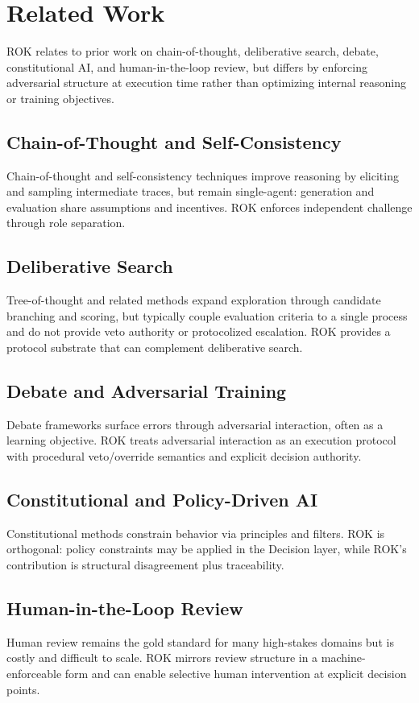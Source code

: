 \section{Related Work}

ROK relates to prior work on chain-of-thought, deliberative search, debate, constitutional AI, and human-in-the-loop review, but differs by enforcing adversarial structure at execution time rather than optimizing internal reasoning or training objectives.

\subsection{Chain-of-Thought and Self-Consistency}
Chain-of-thought and self-consistency techniques improve reasoning by eliciting and sampling intermediate traces, but remain single-agent: generation and evaluation share assumptions and incentives. ROK enforces independent challenge through role separation.

\subsection{Deliberative Search}
Tree-of-thought and related methods expand exploration through candidate branching and scoring, but typically couple evaluation criteria to a single process and do not provide veto authority or protocolized escalation. ROK provides a protocol substrate that can complement deliberative search.

\subsection{Debate and Adversarial Training}
Debate frameworks surface errors through adversarial interaction, often as a learning objective. ROK treats adversarial interaction as an execution protocol with procedural veto/override semantics and explicit decision authority.

\subsection{Constitutional and Policy-Driven AI}
Constitutional methods constrain behavior via principles and filters. ROK is orthogonal: policy constraints may be applied in the Decision layer, while ROK’s contribution is structural disagreement plus traceability.

\subsection{Human-in-the-Loop Review}
Human review remains the gold standard for many high-stakes domains but is costly and difficult to scale. ROK mirrors review structure in a machine-enforceable form and can enable selective human intervention at explicit decision points.

